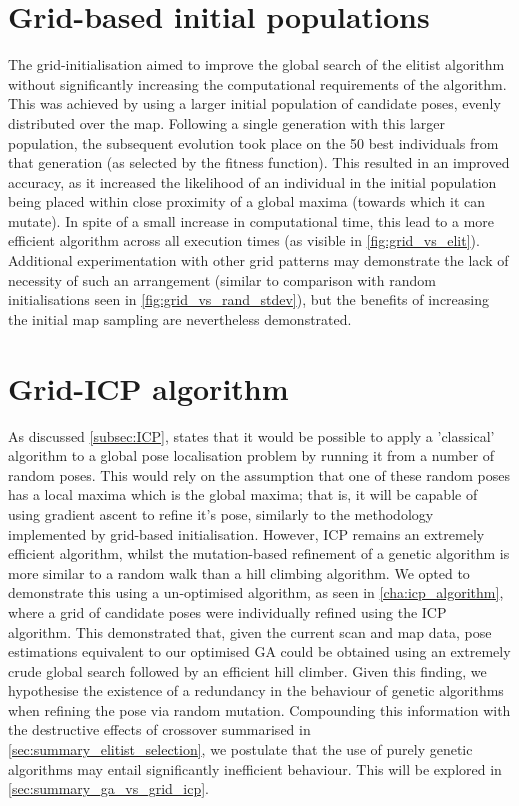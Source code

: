 \documentclass[authoryearcitations]{UoYCSproject}
\begin{document}
\section{Grid-based initial populations}
\label{sec:summary_grid_based_init}
The grid-initialisation aimed to improve the global search of the elitist algorithm without significantly increasing the computational requirements of the algorithm. This was achieved by using a larger initial population of candidate poses, evenly distributed over the map. Following a single generation with this larger population, the subsequent evolution took place on the 50 best individuals from that generation (as selected by the fitness function). This resulted in an improved accuracy, as it increased the likelihood of an individual in the initial population being placed within close proximity of a global maxima (towards which it can mutate). In spite of a small increase in computational time, this lead to a more efficient algorithm across all execution times (as visible in \autoref{fig:grid_vs_elit}). Additional experimentation with other grid patterns may demonstrate the lack of necessity of such an arrangement (similar to comparison with random initialisations seen in \autoref{fig:grid_vs_rand_stdev}), but the benefits of increasing the initial map sampling are nevertheless demonstrated.


\section{Grid-ICP algorithm}
As discussed \autoref{subsec:ICP}, \citet{Censi2005-iv} states that it would be possible to apply a 'classical' algorithm to a global pose localisation problem by running it from a number of random poses. This would rely on the assumption that one of these random poses has a local maxima which is the global maxima; that is, it will be capable of using gradient ascent to refine it's pose, similarly to the methodology implemented by grid-based initialisation. However, ICP remains an extremely efficient algorithm, whilst the mutation-based refinement of a genetic algorithm is more similar to a random walk than a hill climbing algorithm. We opted to demonstrate this using a un-optimised algorithm, as seen in \autoref{cha:icp_algorithm}, where a grid of candidate poses were individually refined using the ICP algorithm. This demonstrated that, given the current scan and map data, pose estimations equivalent to our optimised GA could be obtained using an extremely crude global search followed by an efficient hill climber. Given this finding, we hypothesise the existence of a redundancy in the behaviour of genetic algorithms when refining the pose via random mutation. Compounding this information with the destructive effects of crossover summarised in \autoref{sec:summary_elitist_selection}, we postulate that the use of purely genetic algorithms may entail significantly inefficient behaviour. This will be explored in \autoref{sec:summary_ga_vs_grid_icp}.
\end{document}
